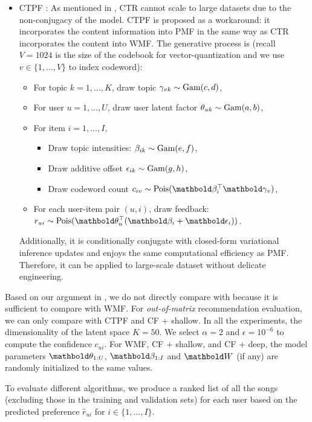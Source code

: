 \begin{itemize}
\item \gls{CTPF} \citep{gopalan2014content}: As mentioned in , \gls{CTR} cannot scale to large datasets due to the non-conjugacy of the model. \gls{CTPF} is proposed as a workaround: it incorporates the content information into \gls{PMF} in the same way as \gls{CTR} incorporates the content into \gls{WMF}. 
The generative process is (recall $V = 1024$ is the size of the codebook for vector-quantization and we use $v \in \{1, \dots, V\}$ to index codeword):
\begin{itemize}
\item For topic $k = 1, \dots, K$, draw topic $\gamma_{vk} \sim \mathrm{Gam}(c, d)$,
\item For user $u = 1, \dots, U$, draw user latent factor $\theta_{uk} \sim \mathrm{Gam}(a, b)$,
\item For item $i = 1, \dots, I$,
\begin{itemize}
\item Draw topic intensities: $\beta_{ik} \sim \mathrm{Gam}(e, f)$,
\item Draw additive offset $\epsilon_{ik} \sim \mathrm{Gam}(g, h)$,
\item Draw codeword count $c_{iv} \sim \pois(\mb\beta_{i}^\top\mb\gamma_v)$,
\end{itemize}
\item For each user-item pair $(u, i)$, draw feedback: $r_{ui} \sim \pois(\mb\theta_u^\top (\mb\beta_i + \mb\epsilon_i) )$.
\end{itemize}
Additionally, it is conditionally conjugate with closed-form variational inference updates and enjoys the same computational efficiency as \gls{PMF}. Therefore, it can be applied to large-scale dataset without delicate engineering.
\end{itemize}

Based on our argument in , we do not directly compare with \citet{van2013deep} because it is sufficient to compare with \gls{WMF}. For \emph{out-of-matrix} recommendation evaluation, we can only compare with \gls{CTPF} and CF + shallow. In all the experiments, the dimensionality of the latent space $K = 50$. We select $\alpha = 2$ and $\epsilon = 10^{-6}$ to compute the confidence $c_{ui}$. For \gls{WMF}, CF + shallow, and CF + deep, the model parameters $\mb\theta_{1:U}$, $\mb\beta_{1:I}$ and $\mbW$ (if any) are randomly initialized to the same values. 

To evaluate different algorithms, we produce a ranked list of all the songs (excluding those in the training and validation sets) for each user based on the predicted preference $\hat{r}_{ui}$ for $i\in\{1, \dots, I\}$. 

